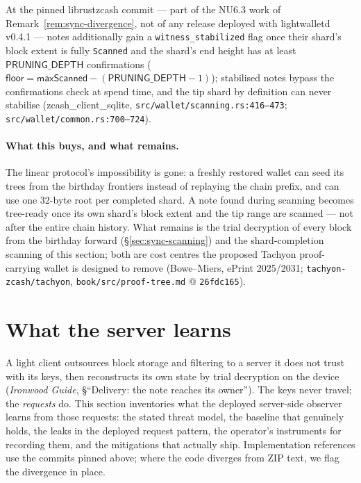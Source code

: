 \documentclass[11pt,a4paper]{article}
\theoremstyle{definition}
\begin{document}
At the pinned \textsf{librustzcash} commit --- part of the NU6.3 work of
Remark~\ref{rem:sync-divergence}, not of any release deployed with
\textsf{lightwalletd} v0.4.1 --- notes additionally gain a
\texttt{witness\_stabilized} flag once their shard's block extent is
fully \texttt{Scanned} and the shard's end height has at least
$\mathsf{PRUNING\_DEPTH}$ confirmations
($\mathsf{floor} = \mathsf{maxScanned} - (\mathsf{PRUNING\_DEPTH} - 1)$);
stabilised notes bypass the confirmations check at spend time, and the
tip shard by definition can never stabilise
(\textsf{zcash\_client\_sqlite},
\texttt{src/wallet/scanning.rs:416--473};
\texttt{src/wallet/common.rs:700--724}).

\paragraph{What this buys, and what remains.} The linear protocol's
impossibility is gone: a freshly restored wallet can seed its trees from
the birthday frontiers instead of replaying the chain prefix, and can use
one $32$-byte root per completed shard. A note found during scanning becomes
tree-ready once its own shard's block extent and the tip range are scanned
--- not after the entire chain history. What remains is the trial decryption
of every
block from the birthday forward (\S\ref{sec:sync-scanning}) and the
shard-completion scanning of this section; both are cost centres the
proposed Tachyon proof-carrying wallet is designed to remove (Bowe--Miers,
ePrint 2025/2031; \texttt{tachyon-zcash/tachyon},
\texttt{book/src/proof-tree.md} @ \texttt{26fdc165}).

\section{What the server learns}\label{sec:sync-privacy}

A light client outsources block storage and filtering to a server it does
not trust with its keys, then reconstructs its own state by trial
decryption on the device (\emph{Ironwood Guide}, \S``Delivery: the note reaches
its owner'').
The keys never travel; the \emph{requests} do. This section inventories
what the deployed server-side observer learns from those requests: the
stated threat model, the baseline that genuinely holds, the leaks in the
deployed request pattern, the operator's instruments for recording them,
and the mitigations that actually ship. Implementation references use the
commits pinned above; where the
code diverges from ZIP text, we flag the divergence in place.
\end{document}
